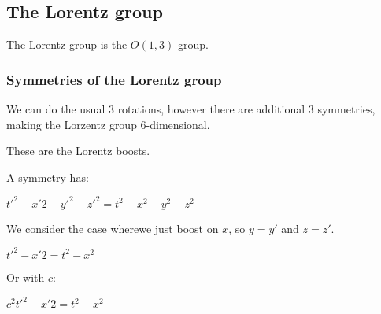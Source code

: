 
\subsection{The Lorentz group}

The Lorentz group is the \(O(1,3)\) group.
\subsubsection{Symmetries of the Lorentz group}

We can do the usual \(3\) rotations, however there are additional \(3\) symmetries, making the Lorzentz group \(6\)-dimensional.

These are the Lorentz boosts.

A symmetry has:

\(t'^2-x'2-y'^2-z'^2=t^2-x^2-y^2-z^2\)

We consider the case wherewe just boost on \(x\), so \(y=y'\) and \(z=z'\).

\(t'^2-x'2=t^2-x^2\)

Or with \(c\):

\(c^2t'^2-x'2=t^2-x^2\)

